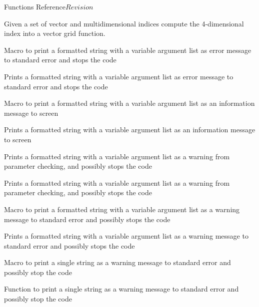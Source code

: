 \begin{cactuspart}{ Functions Reference}{}{$Revision$}
\begin{Lentry}
\item[\code{CCTK\_VECTGFINDEX4D}] [\pageref{CCTK-VECTGFINDEX4D}]
  Given a set of vector and multidimensional indices compute the 4-dimensional
  index into a vector grid function.

\item[\code{CCTK\_VERROR}] [\pageref{CCTK-VERROR}]
  Macro to print a formatted string with a variable argument list as
  error message to standard error and stops the code

\item[\code{CCTK\_VError}] [\pageref{CCTK-VError}]
  Prints a formatted string with a variable argument list as error
  message to standard error and stops the code

\item[\code{CCTK\_VINFO}] [\pageref{CCTK-VINFO}]
  Macro to print a formatted string with a variable argument list as
  an information message to screen

\item[\code{CCTK\_VInfo}] [\pageref{CCTK-VInfo}]
  Prints a formatted string with a variable argument list as an information
  message to screen

\item[\code{CCTK\_VPARAMWARN}] [\pageref{CCTK-VPARAMWARN}]
  Prints a formatted string with a variable argument list as a warning from
  parameter checking, and possibly stops the code

\item[\code{CCTK\_VParamWarn}] [\pageref{CCTK-VParamWarn}]
  Prints a formatted string with a variable argument list as a warning from
  parameter checking, and possibly stops the code

\item[\code{CCTK\_VWARN}] [\pageref{CCTK-VWARN}]
  Macro to print a formatted string with a variable argument list as a
  warning message to standard error and possibly stops the code

\item[\code{CCTK\_VWarn}] [\pageref{CCTK-VWarn}]
  Prints a formatted string with a variable argument list as a warning message
  to standard error and possibly stops the code

\item[\code{CCTK\_WARN}] [\pageref{CCTK-WARN}]
  Macro to print a single string as a warning message to standard error and
  possibly stop the code

\item[\code{CCTK\_Warn}] [\pageref{CCTK-Warn}]
  Function to print a single string as a warning message to standard error and
  possibly stop the code


\end{Lentry}
\end{cactuspart}
